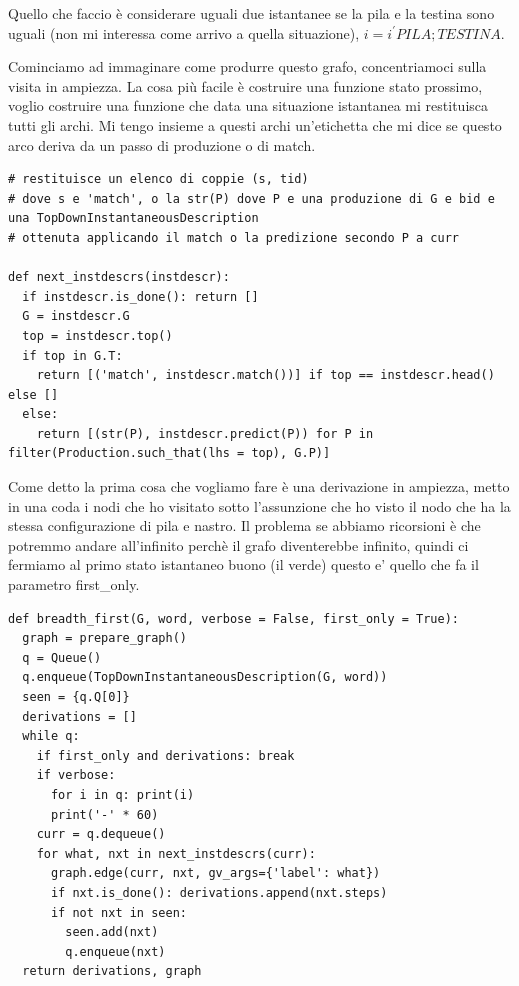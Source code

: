 Quello che faccio è considerare uguali due istantanee se la pila e la testina sono uguali (non mi interessa come arrivo a quella situazione), $i = i^{'} PILA; TESTINA$. 

Cominciamo ad immaginare come produrre questo grafo, concentriamoci sulla visita in ampiezza.
La cosa più facile è costruire una funzione stato prossimo, voglio costruire una funzione che data una situazione istantanea mi restituisca tutti gli archi. Mi tengo insieme a questi archi un'etichetta che mi dice se questo arco deriva da un passo di produzione o di match.

\begin{lstlisting}
# restituisce un elenco di coppie (s, tid) 
# dove s e 'match', o la str(P) dove P e una produzione di G e bid e una TopDownInstantaneousDescription
# ottenuta applicando il match o la predizione secondo P a curr

def next_instdescrs(instdescr):
  if instdescr.is_done(): return []
  G = instdescr.G
  top = instdescr.top()
  if top in G.T:
    return [('match', instdescr.match())] if top == instdescr.head() else []
  else:
    return [(str(P), instdescr.predict(P)) for P in filter(Production.such_that(lhs = top), G.P)]
\end{lstlisting}

Come detto la prima cosa che vogliamo fare è una derivazione in ampiezza, metto in una coda i nodi che ho visitato sotto l'assunzione che ho visto il nodo che ha la stessa configurazione di pila e nastro. Il problema se abbiamo ricorsioni è che potremmo andare all'infinito perchè il grafo diventerebbe infinito, quindi ci fermiamo al primo stato istantaneo buono (il verde) questo e' quello che fa il parametro first\_only.
\begin{lstlisting}
def breadth_first(G, word, verbose = False, first_only = True):
  graph = prepare_graph()
  q = Queue()
  q.enqueue(TopDownInstantaneousDescription(G, word))
  seen = {q.Q[0]}
  derivations = []
  while q:
    if first_only and derivations: break
    if verbose:
      for i in q: print(i)
      print('-' * 60)
    curr = q.dequeue()
    for what, nxt in next_instdescrs(curr):
      graph.edge(curr, nxt, gv_args={'label': what})
      if nxt.is_done(): derivations.append(nxt.steps)
      if not nxt in seen: 
        seen.add(nxt)
        q.enqueue(nxt)  
  return derivations, graph
\end{lstlisting}

